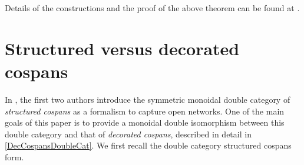 \documentclass[reqno]{amsart}
\begin{document}
Details of the constructions and the proof of the above theorem can be found at \cite{CourserThesis}.








\section{Structured versus decorated cospans} \label{EquivDoubleCats}

In \cite{BC2}, the first two authors introduce the symmetric monoidal double category of \emph{structured cospans} as a formalism to capture open networks. One of the main goals of this paper is to provide a monoidal double isomorphism between this double category and that of \emph{decorated cospans}, described in detail in \cref{DecCospansDoubleCat}. We first recall the double category structured cospans form.
\end{document}
